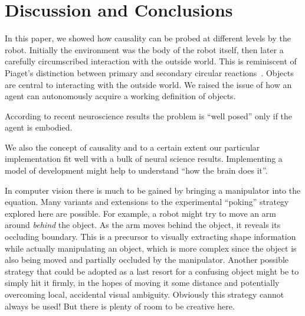 
\section{Discussion and Conclusions}

In this paper, we showed how causality can be probed at different
levels by the robot.  Initially the environment was the body of the
robot itself, then later a carefully circumscribed interaction with
the outside world.  This is reminiscent of Piaget's distinction
between primary and secondary circular
reactions~\cite{ginsburg78piaget}.  Objects are central to interacting
with the outside world.  We raised the issue of how an agent can
autonomously acquire a working definition of objects. 

\ifverbose
According to
recent neuroscience results the problem is ``well posed'' only if the
agent is embodied.
\fi

\ifverbose
We also 
the concept of causality and to a certain extent
our particular implementation fit well with a bulk of neural science
results. Implementing a model of development might help to 
understand ``how the brain does it''.
\fi


In computer vision there is much to be gained by bringing a
manipulator into the equation.  Many variants and extensions to the
experimental ``poking'' strategy explored here are possible.  For
example, a robot might try to move an arm around {\em behind} the
object.  As the arm moves behind the object, it reveals its occluding
boundary.  This is a precursor to visually extracting shape
information while actually manipulating an object, which is more
complex since the object is also being moved and partially occluded by
the manipulator.  Another possible strategy that could be adopted as a
last resort for a confusing object might be to simply hit it firmly,
in the hopes of moving it some distance and potentially overcoming
local, accidental visual ambiguity.  Obviously this strategy cannot
always be used!  But there is plenty of room to be creative here.



